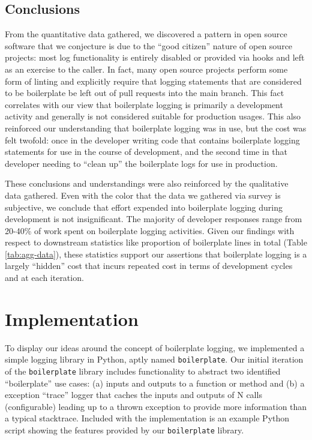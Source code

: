 \documentclass[acmsmall,review,authorversion]{acmart}
\newcommand{\code}[1]{\lstinline[basicstyle=\ttfamily\small]~#1~}
\begin{document}
\subsection{Conclusions}

From the quantitative data gathered, we discovered a pattern in open source software that we conjecture is due to the ``good citizen'' nature of open source projects: most log functionality is entirely disabled or provided via hooks and left as an exercise to the caller. In fact, many open source projects perform some form of linting and explicitly require that logging statements that are considered to be boilerplate be left out of pull requests into the main branch. This fact correlates with our view that boilerplate logging is primarily a development activity and generally is not considered suitable for production usages. This also reinforced our understanding that boilerplate logging was in use, but the cost was felt twofold: once in the developer writing code that contains boilerplate logging statements for use in the course of development, and the second time in that developer needing to ``clean up'' the boilerplate logs for use in production.

These conclusions and understandings were also reinforced by the qualitative data gathered. Even with the color that the data we gathered via survey is subjective, we conclude that effort expended into boilerplate logging during development is not insignificant. The majority of developer responses range from 20-40\% of work spent on boilerplate logging activities. Given our findings with respect to downstream statistics like proportion of boilerplate lines in total (Table \ref{tab:agg-data}), these statistics support our assertions that boilerplate logging is a largely ``hidden'' cost that incurs repeated cost in terms of development cycles and at each iteration.

\section{Implementation}

To display our ideas around the concept of boilerplate logging, we implemented a simple logging library in Python, aptly named \code{boilerplate}. Our initial iteration of the \code{boilerplate} library includes functionality to abstract two identified ``boilerplate'' use cases: (a) inputs and outputs to a function or method and (b) a exception ``trace'' logger that caches the inputs and outputs of N calls (configurable) leading up to a thrown exception to provide more information than a typical stacktrace. Included with the implementation is an example Python script showing the features provided by our \code{boilerplate} library.
\end{document}
